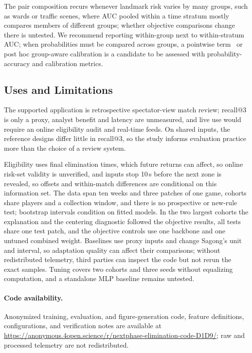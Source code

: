 \documentclass[sigconf,anonymous]{acmart}
\newcommand{\artifacturl}{\url{https://anonymous.4open.science/r/nextphase-elimination-code-D1D9/}}
\begin{document}
The pair composition recurs whenever landmark risk varies by many groups, such as wards or traffic scenes, where AUC pooled within a time stratum mostly compares members of different groups; whether objective comparisons change there is untested. We recommend reporting within-group next to within-stratum AUC; when probabilities must be compared across groups, a pointwise term~\cite{Bai23} or post hoc group-aware calibration is a candidate to be assessed with probability-accuracy and calibration metrics.

\subsection{Uses and Limitations}
\label{sec:discussion:limits}
The supported application is retrospective spectator-view match review; recall@3 is only a proxy, analyst benefit and latency are unmeasured, and live use would require an online eligibility audit and real-time feeds. On shared inputs, the reference designs differ little in recall@3, so the study informs evaluation practice more than the choice of a review system.

Eligibility uses final elimination times, which future returns can affect, so online risk-set validity is unverified, and inputs stop 10\,s before the next zone is revealed, so offsets and within-match differences are conditional on this information set. The data span ten weeks and three patches of one game, cohorts share players and a collection window, and there is no prospective or new-rule test; bootstrap intervals condition on fitted models. In the two largest cohorts the explanation and the centering diagnostic followed the objective results, all tests share one test patch, and the objective controls use one backbone and one untuned combined weight. Baselines use proxy inputs and change Sagong's unit and interval, so adaptation quality can affect their comparisons; without redistributed telemetry, third parties can inspect the code but not rerun the exact samples. Tuning covers two cohorts and three seeds without equalizing computation, and a standalone MLP baseline remains untested.

\paragraph{Code availability.}
Anonymized training, evaluation, and figure-generation code, feature definitions, configurations, and verification notes are available at \artifacturl{}; raw and processed telemetry are not redistributed.
\end{document}
